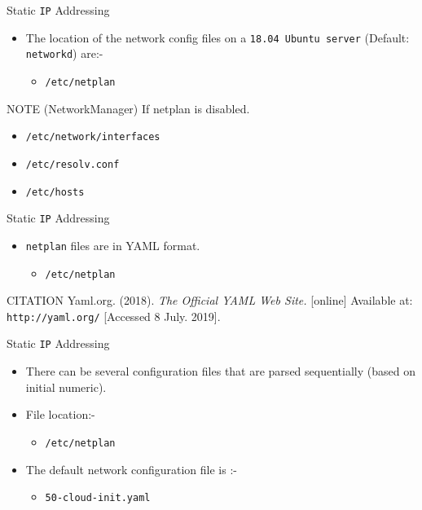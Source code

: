 \documentclass{beamer}
\begin{document}
\begin{frame}{Static \texttt{IP} Addressing}
  \begin{itemize}
    \item The location of the network config files on a \texttt{18.04 Ubuntu server} (Default: \texttt{networkd}) are:-
    \begin{itemize}
      \item \texttt{/etc/netplan}
    \end{itemize} 
  \end{itemize}
  \begin{block}{NOTE (NetworkManager)}
    If netplan is disabled.
    \begin{itemize}
      \item \texttt{/etc/network/interfaces}
      \item \texttt{/etc/resolv.conf}
      \item \texttt{/etc/hosts}
    \end{itemize} 
  \end{block}
\end{frame}

\begin{frame}{Static \texttt{IP} Addressing}
  \begin{itemize}
    \item \texttt{netplan} files are in YAML format.
    \begin{itemize}
      \item \texttt{/etc/netplan}
    \end{itemize} 
  \end{itemize}
  \begin{block}{CITATION}
    Yaml.org. (2018). \textit{The Official YAML Web Site.} [online] Available at: \texttt{http://yaml.org/} [Accessed 8 July. 2019].
  \end{block}
\end{frame}

\begin{frame}{Static \texttt{IP} Addressing}
  \begin{itemize}
    \item There can be several configuration files that are parsed sequentially (based on initial numeric).
    \item File location:-
    \begin{itemize}
      \item \texttt{/etc/netplan}
    \end{itemize} 
    \item The default network configuration file is :-
    \begin{itemize}
      \item \texttt{50-cloud-init.yaml}
    \end{itemize} 
  \end{itemize}
\end{frame}
\end{document}
